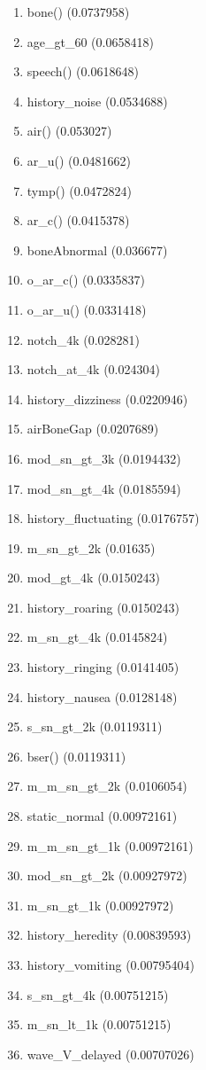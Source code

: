 \begin{enumerate}
\item bone() (0.0737958)
\item age\_gt\_60 (0.0658418)
\item speech() (0.0618648)
\item history\_noise (0.0534688)
\item air() (0.053027)
\item ar\_u() (0.0481662)
\item tymp() (0.0472824)
\item ar\_c() (0.0415378)
\item boneAbnormal (0.036677)
\item o\_ar\_c() (0.0335837)
\item o\_ar\_u() (0.0331418)
\item notch\_4k (0.028281)
\item notch\_at\_4k (0.024304)
\item history\_dizziness (0.0220946)
\item airBoneGap (0.0207689)
\item mod\_sn\_gt\_3k (0.0194432)
\item mod\_sn\_gt\_4k (0.0185594)
\item history\_fluctuating (0.0176757)
\item m\_sn\_gt\_2k (0.01635)
\item mod\_gt\_4k (0.0150243)
\item history\_roaring (0.0150243)
\item m\_sn\_gt\_4k (0.0145824)
\item history\_ringing (0.0141405)
\item history\_nausea (0.0128148)
\item s\_sn\_gt\_2k (0.0119311)
\item bser() (0.0119311)
\item m\_m\_sn\_gt\_2k (0.0106054)
\item static\_normal (0.00972161)
\item m\_m\_sn\_gt\_1k (0.00972161)
\item mod\_sn\_gt\_2k (0.00927972)
\item m\_sn\_gt\_1k (0.00927972)
\item history\_heredity (0.00839593)
\item history\_vomiting (0.00795404)
\item s\_sn\_gt\_4k (0.00751215)
\item m\_sn\_lt\_1k (0.00751215)
\item wave\_V\_delayed (0.00707026)

\end{enumerate}
